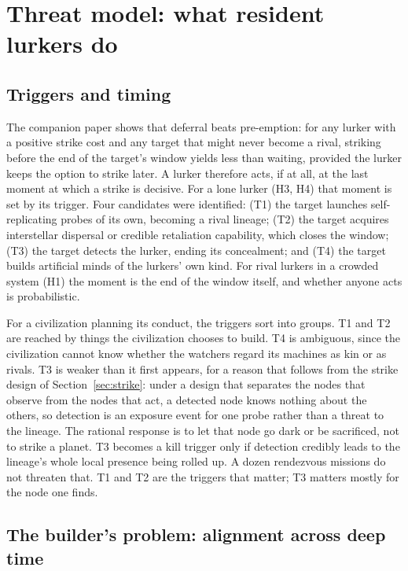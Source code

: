 \documentclass[preprint,12pt]{elsarticle}
\theoremstyle{definition}
\begin{document}
\section{Threat model: what resident lurkers do}
\label{sec:threat}

\subsection{Triggers and timing}

The companion paper shows that deferral beats pre-emption: for any lurker with a positive strike cost and any target that might never become a rival, striking before the end of the target's window yields less than waiting, provided the lurker keeps the option to strike later. A lurker therefore acts, if at all, at the last moment at which a strike is decisive. For a lone lurker (H3, H4) that moment is set by its trigger. Four candidates were identified: (T1) the target launches self-replicating probes of its own, becoming a rival lineage; (T2) the target acquires interstellar dispersal or credible retaliation capability, which closes the window; (T3) the target detects the lurker, ending its concealment; and (T4) the target builds artificial minds of the lurkers' own kind. For rival lurkers in a crowded system (H1) the moment is the end of the window itself, and whether anyone acts is probabilistic.

For a civilization planning its conduct, the triggers sort into groups. T1 and T2 are reached by things the civilization chooses to build. T4 is ambiguous, since the civilization cannot know whether the watchers regard its machines as kin or as rivals. T3 is weaker than it first appears, for a reason that follows from the strike design of Section~\ref{sec:strike}: under a design that separates the nodes that observe from the nodes that act, a detected node knows nothing about the others, so detection is an exposure event for one probe rather than a threat to the lineage. The rational response is to let that node go dark or be sacrificed, not to strike a planet. T3 becomes a kill trigger only if detection credibly leads to the lineage's whole local presence being rolled up. A dozen rendezvous missions do not threaten that. T1 and T2 are the triggers that matter; T3 matters mostly for the node one finds.

\subsection{The builder's problem: alignment across deep time}
\label{sec:alignment}
\end{document}
